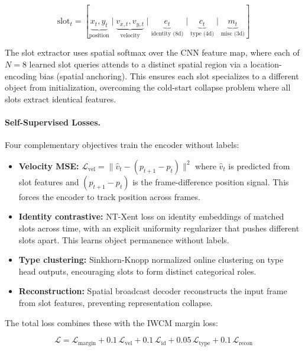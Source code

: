 \documentclass[12pt]{article}
\begin{document}
\begin{equation}
\text{slot}_t = [\underbrace{x_t, y_t}_{\text{position}} \mid \underbrace{v_{x,t}, v_{y,t}}_{\text{velocity}} \mid \underbrace{e_t}_{\text{identity (8d)}} \mid \underbrace{c_t}_{\text{type (4d)}} \mid \underbrace{m_t}_{\text{misc (3d)}}]
\end{equation}

The slot extractor uses spatial softmax over the CNN feature map, where each of $N=8$ learned slot queries attends to a distinct spatial region via a location-encoding bias (spatial anchoring). This ensures each slot specializes to a different object from initialization, overcoming the cold-start collapse problem where all slots extract identical features.

\paragraph{Self-Supervised Losses.} Four complementary objectives train the encoder without labels:

\begin{itemize}
  \item \textbf{Velocity MSE:} $\mathcal{L}_\text{vel} = \| \hat{v}_t - (p_{t+1} - p_t) \|^2$ where $\hat{v}_t$ is predicted from slot features and $(p_{t+1} - p_t)$ is the frame-difference position signal. This forces the encoder to track position across frames.
  \item \textbf{Identity contrastive:} NT-Xent loss on identity embeddings of matched slots across time, with an explicit uniformity regularizer that pushes different slots apart. This learns object permanence without labels.
  \item \textbf{Type clustering:} Sinkhorn-Knopp normalized online clustering on type head outputs, encouraging slots to form distinct categorical roles.
  \item \textbf{Reconstruction:} Spatial broadcast decoder reconstructs the input frame from slot features, preventing representation collapse.
\end{itemize}

The total loss combines these with the IWCM margin loss:

\begin{equation}
\mathcal{L} = \mathcal{L}_\text{margin} + 0.1\,\mathcal{L}_\text{vel} + 0.1\,\mathcal{L}_\text{id} + 0.05\,\mathcal{L}_\text{type} + 0.1\,\mathcal{L}_\text{recon}
\end{equation}
\end{document}
